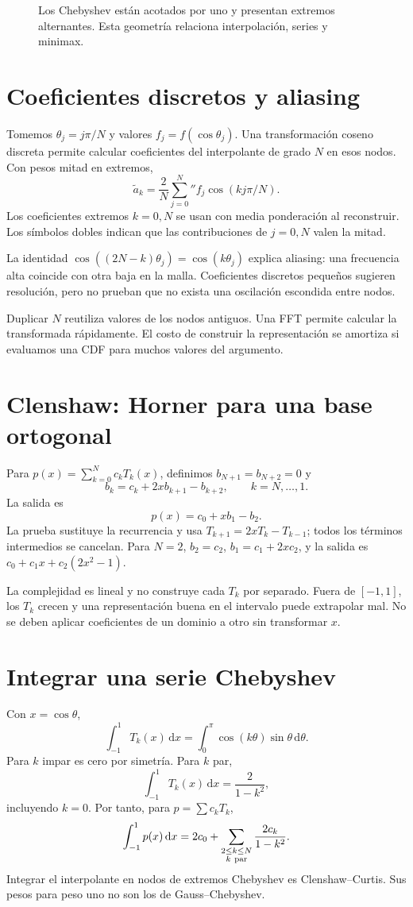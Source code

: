 \documentclass[11pt,a4paper]{article}
\newcommand{\dd}{\,\mathrm d}
\theoremstyle{definition}
\begin{document}
\begin{figure}[htbp]
\caption{Los Chebyshev están acotados por uno y presentan extremos alternantes. Esta geometría relaciona interpolación, series y minimax.}\label{fig:cdf-8}\end{figure}

\section{Coeficientes discretos y aliasing}
Tomemos $\theta_j=j\pi/N$ y valores $f_j=f(\cos\theta_j)$. Una transformación coseno discreta permite calcular coeficientes del interpolante de grado $N$ en esos nodos. Con pesos mitad en extremos,
\[
\widetilde a_k=\frac2N\sum_{j=0}^N{}''
f_j\cos(kj\pi/N).
\]
Los coeficientes extremos $k=0,N$ se usan con media ponderación al reconstruir. Los símbolos dobles indican que las contribuciones de $j=0,N$ valen la mitad.

La identidad $\cos((2N-k)\theta_j)=\cos(k\theta_j)$ explica aliasing: una frecuencia alta coincide con otra baja en la malla. Coeficientes discretos pequeños sugieren resolución, pero no prueban que no exista una oscilación escondida entre nodos.

Duplicar $N$ reutiliza valores de los nodos antiguos. Una FFT permite calcular la transformada rápidamente. El costo de construir la representación se amortiza si evaluamos una CDF para muchos valores del argumento.

\section{Clenshaw: Horner para una base ortogonal}
Para $p(x)=\sum_{k=0}^N c_kT_k(x)$, definimos $b_{N+1}=b_{N+2}=0$ y
\[
b_k=c_k+2xb_{k+1}-b_{k+2},\qquad k=N,\ldots,1.
\]
La salida es
\[
p(x)=c_0+xb_1-b_2.
\]
La prueba sustituye la recurrencia y usa $T_{k+1}=2xT_k-T_{k-1}$; todos los términos intermedios se cancelan. Para $N=2$, $b_2=c_2$, $b_1=c_1+2xc_2$, y la salida es
$c_0+c_1x+c_2(2x^2-1)$.

La complejidad es lineal y no construye cada $T_k$ por separado. Fuera de $[-1,1]$, los $T_k$ crecen y una representación buena en el intervalo puede extrapolar mal. No se deben aplicar coeficientes de un dominio a otro sin transformar $x$.

\section{Integrar una serie Chebyshev}
Con $x=\cos\theta$,
\[
\int_{-1}^1T_k(x)\dd x
=\int_0^\pi\cos(k\theta)\sin\theta\dd\theta.
\]
Para $k$ impar es cero por simetría. Para $k$ par,
\[
\int_{-1}^1T_k(x)\dd x=\frac2{1-k^2},
\]
incluyendo $k=0$. Por tanto, para $p=\sum c_kT_k$,
\[
\int_{-1}^1p(x)\dd x
=2c_0+\sum_{\substack{2\le k\le N\\k\ {\rm par}}}\frac{2c_k}{1-k^2}.
\]
Integrar el interpolante en nodos de extremos Chebyshev es Clenshaw--Curtis. Sus pesos para peso uno no son los de Gauss--Chebyshev.
\end{document}
